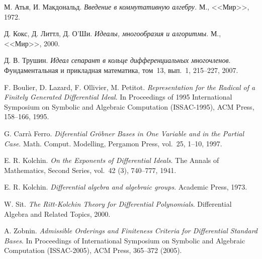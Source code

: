 \documentclass[11pt]{article}
\theoremstyle{plain1}
\theoremstyle{plain2}
\theoremstyle{plain}
\theoremstyle{plain3}
\theoremstyle{definition}
\theoremstyle{remark}
\begin{document}
\begin{thebibliography}{99}

М. Атья, И. Макдональд.
\emph{Введение в коммутативную алгебру.} М., <<Мир>>, 1972.

Д. Кокс, Д. Литтл, Д. О'Ши.
\emph{Идеалы, многообразия и алгоритмы}.
М., <<Мир>>, 2000.

Д. В. Трушин.
\emph{Идеал сепарант в кольце дифференциальных многочленов}.
Фундаментальная и прикладная математика, том~13, вып.~1, 215--227, 2007.

F. Boulier, D. Lazard, F. Ollivier, M. Petitot.
\emph{Representation for the Radical of a Finitely Generated Differential Ideal}.
In Proceedings of 1995 International Symposium on Symbolic and Algebraic Computation (ISSAC-1995), ACM Press, 158--166, 1995.
 
G. Carr\`a Ferro.
\emph{Diferential Gr\"{o}bner Bases in One Variable and in the Partial Case}.
Math. Comput. Modelling, Pergamon Press, vol.~25, 1--10, 1997.

E. R. Kolchin.
\emph{On the Exponents of Differential Ideals}.
The Annals of Mathematics, Second Series, vol.~42 (3), 740--777, 1941.

E. R. Kolchin.
\emph{Differential algebra and algebraic groups}.
Academic Press, 1973.

W. Sit.
\emph{The Ritt-Kolchin Theory for Differential Polynomials}.
Differential Algebra and Related Topics, 2000.

A. Zobnin. 
\emph{Admissible Orderings and Finiteness Criteria for Differential Standard Bases}. 
In Proceedings of International Symposium on Symbolic and Algebraic Computation (ISSAC-2005), ACM Press,
365--372 (2005).
\end{thebibliography}
\end{document}
